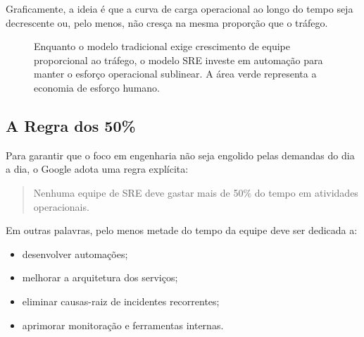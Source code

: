 \documentclass[12pt,a4paper]{report}
\begin{document}
Graficamente, a ideia é que a curva de carga operacional ao longo do tempo
seja decrescente ou, pelo menos, não cresça na mesma proporção que o
tráfego.

\begin{figure}[h]
    \centering
    \caption{Enquanto o modelo tradicional exige crescimento de equipe proporcional ao tráfego, o modelo SRE investe em automação para manter o esforço operacional sublinear. A área verde representa a economia de esforço humano.}
\end{figure}

\subsection{A Regra dos 50\%}

Para garantir que o foco em engenharia não seja engolido pelas demandas do
dia a dia, o Google adota uma regra explícita:
\begin{quote}
Nenhuma equipe de SRE deve gastar mais de 50\% do tempo em atividades
operacionais.
\end{quote}

Em outras palavras, pelo menos metade do tempo da equipe deve ser dedicada a:
\begin{itemize}[nosep]
    \item desenvolver automações;
    \item melhorar a arquitetura dos serviços;
    \item eliminar causas-raiz de incidentes recorrentes;
    \item aprimorar monitoração e ferramentas internas.
\end{itemize}
\end{document}

